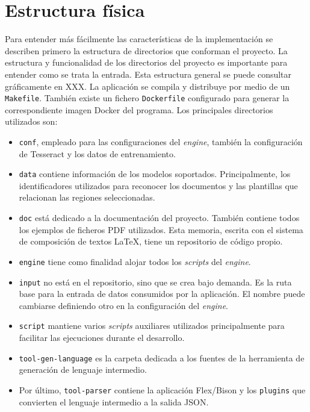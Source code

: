 


\section{Estructura física}

Para entender más fácilmente las características de la implementación se describen primero la estructura de directorios que conforman el proyecto. 
La estructura y funcionalidad de los directorios del proyecto es importante para entender como se trata la entrada. Esta estructura general se puede consultar gráficamente en XXX. La aplicación se compila y distribuye por medio de un \verb|Makefile|. También existe un fichero \verb|Dockerfile| configurado para generar la correspondiente imagen Docker del programa. Los principales directorios utilizados son:

\begin{itemize}
    \item \verb|conf|, empleado para las configuraciones del \emph{engine}, también la configuración de Tesseract y los datos de entrenamiento.
    \item \verb|data| contiene información de los modelos soportados. Principalmente, los identificadores utilizados para reconocer los documentos y las plantillas que relacionan las regiones seleccionadas.
    \item \verb|doc| está dedicado a la documentación del proyecto. También contiene todos los ejemplos de ficheros PDF utilizados. Esta memoria, escrita con el sistema de composición de textos \LaTeX,  tiene un repositorio de código propio.
    \item \verb|engine| tiene como finalidad alojar todos los \emph{scripts} del \emph{engine}.
    \item \verb|input| no está en el repositorio, sino que se crea bajo demanda. Es la ruta base para la entrada de datos consumidos por la aplicación. El nombre puede cambiarse definiendo otro en la configuración del \emph{engine}.
    \item \verb|script| mantiene varios \emph{scripts} auxiliares utilizados principalmente para facilitar las ejecuciones durante el desarrollo.
    \item \verb|tool-gen-language| es la carpeta dedicada a los fuentes de la herramienta de generación de lenguaje intermedio.
    \item Por último, \verb|tool-parser| contiene la aplicación Flex/Bison y los \verb|plugins| que convierten el lenguaje intermedio a la salida JSON.
\end{itemize}

